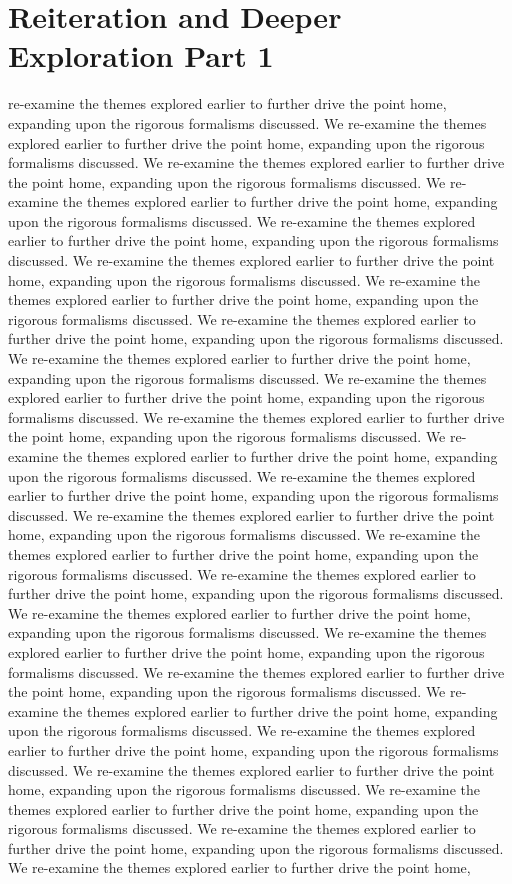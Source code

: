 \section{Reiteration and Deeper Exploration Part 1}\nWe re-examine the themes explored earlier to further drive the point home, expanding upon the rigorous formalisms discussed. We re-examine the themes explored earlier to further drive the point home, expanding upon the rigorous formalisms discussed. We re-examine the themes explored earlier to further drive the point home, expanding upon the rigorous formalisms discussed. We re-examine the themes explored earlier to further drive the point home, expanding upon the rigorous formalisms discussed. We re-examine the themes explored earlier to further drive the point home, expanding upon the rigorous formalisms discussed. We re-examine the themes explored earlier to further drive the point home, expanding upon the rigorous formalisms discussed. We re-examine the themes explored earlier to further drive the point home, expanding upon the rigorous formalisms discussed. We re-examine the themes explored earlier to further drive the point home, expanding upon the rigorous formalisms discussed. We re-examine the themes explored earlier to further drive the point home, expanding upon the rigorous formalisms discussed. We re-examine the themes explored earlier to further drive the point home, expanding upon the rigorous formalisms discussed. We re-examine the themes explored earlier to further drive the point home, expanding upon the rigorous formalisms discussed. We re-examine the themes explored earlier to further drive the point home, expanding upon the rigorous formalisms discussed. We re-examine the themes explored earlier to further drive the point home, expanding upon the rigorous formalisms discussed. We re-examine the themes explored earlier to further drive the point home, expanding upon the rigorous formalisms discussed. We re-examine the themes explored earlier to further drive the point home, expanding upon the rigorous formalisms discussed. We re-examine the themes explored earlier to further drive the point home, expanding upon the rigorous formalisms discussed. We re-examine the themes explored earlier to further drive the point home, expanding upon the rigorous formalisms discussed. We re-examine the themes explored earlier to further drive the point home, expanding upon the rigorous formalisms discussed. We re-examine the themes explored earlier to further drive the point home, expanding upon the rigorous formalisms discussed. We re-examine the themes explored earlier to further drive the point home, expanding upon the rigorous formalisms discussed. We re-examine the themes explored earlier to further drive the point home, expanding upon the rigorous formalisms discussed. We re-examine the themes explored earlier to further drive the point home, expanding upon the rigorous formalisms discussed. We re-examine the themes explored earlier to further drive the point home, expanding upon the rigorous formalisms discussed. We re-examine the themes explored earlier to further drive the point home, expanding upon the rigorous formalisms discussed. We re-examine the themes explored earlier to further drive the point home, 